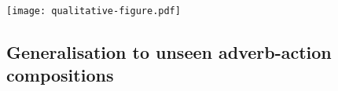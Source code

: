 \documentclass[table]{bmvc2k}
\newcommand{\modelName}{\textsc{ReGAdA}\xspace}
\newcommand{\vatex}{VATEX}
\newcommand{\acreg}{AC\textsubscript{\textsc{reg}}}
\begin{document}
\begin{figure*}
    \begin{center}
    \texttt{[image: qualitative-figure.pdf]} 
    \end{center}
    \caption{Example results for \modelName (Ours) on the \vatex\ dataset compared to those from \acreg. The two left examples are success cases for our model. The third and fourth example show bidirectionally performed actions that are labelled with only one of the adverbs. The right-most example shows a wrongly labelled video. Full videos are available at: \url{https://hummelth.github.io/ReGaDa}
}
    \label{fig:qualitative}
 \vspace{-10pt}
\end{figure*}

\subsection{Generalisation to unseen adverb-action compositions}\label{unseen}
\end{document}
